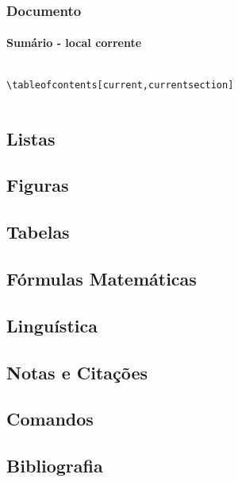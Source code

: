\begin{frame}[fragile]
\frametitle{Documento}
\framesubtitle{Sumário - local corrente}
  \scriptsize
  \begin{columns}[c]
  \begin{verbatim}
\tableofcontents[current,currentsection]
  \end{verbatim} 
  \begin{fmpage}{\textwidth}
  \scriptsize
  \end{fmpage}
  \end{columns}
\end{frame}


\subsection{Listas}\label{sec:listas}


\subsection{Figuras}\label{sec:figuras}


\subsection{Tabelas}\label{sec:tabelas}


\subsection{Fórmulas Matemáticas}\label{sec:formulasmat}


\subsection{Linguística}\label{sec:linguistica}


\subsection{Notas e Citações}\label{sec:notascita}


\subsection{Comandos}\label{sec:comandos}


\subsection{Bibliografia}\label{sec:bibtex}

